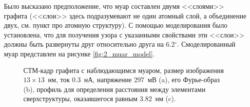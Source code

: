 \documentclass[a4paper, 12pt]{article}
\begin{document}
	Было высказано предположение, что муар составлен двумя <<слоями>> графита (<<слои>> здесь подразумевают не один атомный слой, а объединение двух, см. пункт про атомную структуру). С помощью моделирования было установлена, что для получения узора с указанными свойствами эти <<слои>> должны быть развернуты друг относительно друга на 6.2$^\circ$. Смоделированный муар представлен на рисунке \ref{fig:2_muar_model}.
	
	\begin{figure}[H]
		\centering
		\caption{СТМ-кадр графита с наблюдающимся муаром, размер изображения $13\times13$~нм, ток 0.3~нА, напряжение 297~мВ (a), его Фурье-образ (b), профиль для определения расстояния между элементами сверхструктуры, оказавшегося равным 3.82~нм (c).}
		\label{fig:2_muar}
	\end{figure}
	
\end{document}
